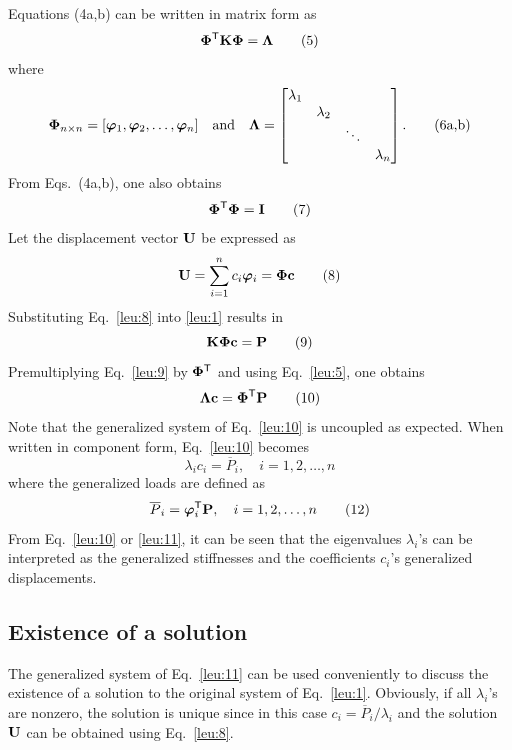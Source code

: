 Equations (4a,b) can be written in matrix form as
\begin{equation}
  \bm{\Phi}^{\mathsf{T}}\mathbf{K}\bm{\Phi} = \bm{\Lambda} \tag{5}\label{leu:5}
\end{equation}
where
\begin{equation}
  \bm{\Phi}_{n\times n} = [\bm{\varphi}_1,\bm{\varphi}_2,\dots,\bm{\varphi}_n]\quad\text{and}\quad
  \bm{\Lambda} = \begin{bmatrix}\lambda_1 & & & \\ & \lambda_2 & & \\ & & \ddots & \\ & & & \lambda_n\end{bmatrix}. \tag{6a,b}
\end{equation}
From Eqs.~(4a,b), one also obtains
\begin{equation}
  \bm{\Phi}^{\mathsf{T}}\bm{\Phi} = \mathbf{I} \tag{7}
\end{equation}
Let the displacement vector $\mathbf{U}$ be expressed as
\begin{equation}
  \mathbf{U} = \sum_{i=1}^{n}c_i\bm{\varphi}_i = \bm{\Phi}\mathbf{c} \tag{8}\label{leu:8}
\end{equation}
Substituting Eq.~\eqref{leu:8} into \eqref{leu:1} results in
\begin{equation}
  \mathbf{K}\bm{\Phi}\mathbf{c} = \mathbf{P} \tag{9}\label{leu:9}
\end{equation}
Premultiplying Eq.~\eqref{leu:9} by $\bm{\Phi}^{\mathsf{T}}$ and using Eq.~\eqref{leu:5}, one obtains
\begin{equation}
  \bm{\Lambda}\mathbf{c} = \bm{\Phi}^{\mathsf{T}}\mathbf{P} \tag{10}\label{leu:10}
\end{equation}
Note that the generalized system of Eq.~\eqref{leu:10} is uncoupled as expected. When written in component form, Eq.~\eqref{leu:10} becomes
\begin{equation}
  \lambda_i c_i = \overline{P}_i,\quad i = 1,2,\dots,n \tag{11}\label{leu:11}
\end{equation}
where the generalized loads are defined as
\begin{equation}
  \overline{P}_i = \bm{\varphi}_i^{\mathsf{T}}\mathbf{P},\quad i = 1,2,\dots,n \tag{12}
\end{equation}
From Eq.~\eqref{leu:10} or \eqref{leu:11}, it can be seen that the eigenvalues $\lambda_i$'s can be interpreted as the generalized stiffnesses and the coefficients $c_i$'s generalized displacements.

\subsection*{Existence of a solution}
The generalized system of Eq.~\eqref{leu:11} can be used conveniently to discuss the existence of a solution to the original system of Eq.~\eqref{leu:1}. Obviously, if all $\lambda_i$'s are nonzero, the solution is unique since in this case $c_i = \overline{P}_i/\lambda_i$ and the solution $\mathbf{U}$ can be obtained using Eq.~\eqref{leu:8}.

